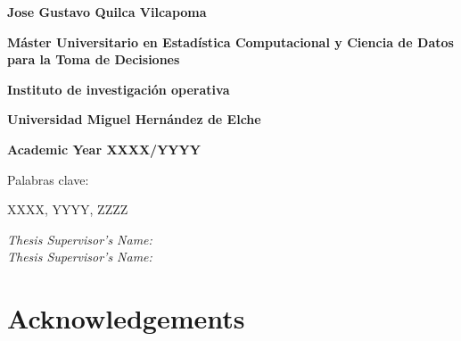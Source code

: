 \documentclass[openany]{article}
\begin{document}
\begin{titlepage}
    {\flushleft \LARGE \bfseries Jose Gustavo Quilca Vilcapoma \par}\vspace{1.5cm}

    {\flushleft \Large \bfseries Máster Universitario en Estadística Computacional y Ciencia de Datos para la Toma de Decisiones\par}\vspace{0.cm}
    {\flushleft \Large \bfseries Instituto de investigación operativa\par}\vspace{0.cm}
    {\flushleft \Large \bfseries Universidad Miguel Hernández de Elche\par}\vspace{0.cm}
    {\flushleft \small \bfseries Academic Year XXXX/YYYY\par}\vspace{1.5cm}

    {\flushleft \normalsize Palabras clave:\par}\vspace{0cm}

    {XXXX, YYYY, ZZZZ \par}
    \vspace{1.5cm}

    {\flushleft \normalsize \textit{Thesis Supervisor’s Name: }\\}\vspace{0cm}
    {\flushleft \normalsize \textit{Thesis Supervisor’s Name: }\\}\vspace{0cm}

\end{titlepage}

\clearpage\thispagestyle{empty}\null\newpage %

\newpage
\thispagestyle{plain}

\mbox{}\par
\vspace{4.5cm}


\clearpage\thispagestyle{empty}\null\newpage %

\newpage
\thispagestyle{plain}
\section*{Acknowledgements}
\end{document}
